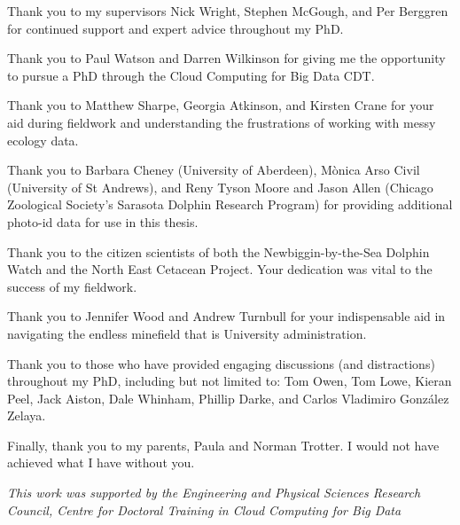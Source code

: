 
\begin{acknowledgements}

\noindent Thank you to my supervisors Nick Wright, Stephen McGough, and Per Berggren for continued support and expert advice throughout my PhD. \newline

\noindent Thank you to Paul Watson and Darren Wilkinson for giving me the opportunity to pursue a PhD through the Cloud Computing for Big Data CDT. \newline

\noindent Thank you to Matthew Sharpe, Georgia Atkinson, and Kirsten Crane for your aid during fieldwork and understanding the frustrations of working with messy ecology data.\newline

\noindent Thank you to Barbara Cheney (University of Aberdeen), M\`{o}nica Arso Civil (University of St Andrews), and Reny Tyson Moore and Jason Allen (Chicago Zoological Society's Sarasota Dolphin Research Program) for providing additional photo-id data for use in this thesis.\newline

\noindent Thank you to the citizen scientists of both the Newbiggin-by-the-Sea Dolphin Watch and the North East Cetacean Project. Your dedication was vital to the success of my fieldwork. \newline

\noindent Thank you to Jennifer Wood and Andrew Turnbull for your indispensable aid in navigating the endless minefield that is University administration.\newline

\noindent Thank you to those who have provided engaging discussions (and distractions) throughout my PhD, including but not limited to: Tom Owen, Tom Lowe, Kieran Peel, Jack Aiston, Dale Whinham, Phillip Darke, and Carlos Vladimiro González Zelaya. \newline

\noindent Finally, thank you to my parents, Paula and Norman Trotter. I would not have achieved what I have without you.\newline

\noindent \centering\textit{This work was supported by the Engineering and Physical Sciences Research Council, Centre for Doctoral Training in Cloud Computing for Big Data\newline[EP/L015358/1]} 

\end{acknowledgements}
